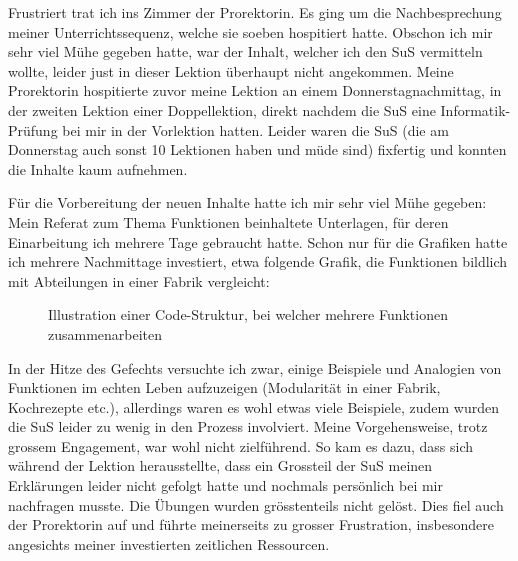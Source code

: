 \begin{myExBox}[title=Beispiel aus der eigenen Unterrichtserfahrung]
Frustriert trat ich ins Zimmer der Prorektorin. Es ging um die Nachbesprechung meiner Unterrichtssequenz, welche sie soeben hospitiert hatte. Obschon ich mir sehr viel Mühe gegeben hatte, war der Inhalt, welcher ich den SuS vermitteln wollte, leider just in dieser Lektion überhaupt nicht angekommen. Meine Prorektorin hospitierte zuvor meine Lektion an einem Donnerstagnachmittag, in der zweiten Lektion einer Doppellektion, direkt nachdem die SuS eine Informatik-Prüfung bei mir in der Vorlektion hatten. Leider waren die SuS (die am Donnerstag auch sonst 10 Lektionen haben und müde sind) fixfertig und konnten die Inhalte kaum aufnehmen.


Für die Vorbereitung der neuen Inhalte hatte ich mir sehr viel Mühe gegeben: Mein Referat zum Thema Funktionen beinhaltete Unterlagen, für deren Einarbeitung ich mehrere Tage gebraucht hatte. Schon nur für die Grafiken hatte ich mehrere Nachmittage investiert, etwa folgende Grafik, die Funktionen bildlich mit Abteilungen in einer Fabrik vergleicht:

\begin{figure}[H]
	\centering
	\caption{Illustration einer Code-Struktur, bei welcher mehrere Funktionen zusammenarbeiten}
\end{figure}
In der Hitze des Gefechts versuchte ich zwar, einige Beispiele und Analogien von Funktionen im echten Leben aufzuzeigen (Modularität in einer Fabrik, Kochrezepte etc.), allerdings waren es wohl etwas viele Beispiele, zudem wurden die SuS leider zu wenig in den Prozess involviert. Meine Vorgehensweise, trotz grossem Engagement, war wohl nicht zielführend. So kam es dazu, dass sich während der Lektion herausstellte, dass ein Grossteil der SuS meinen Erklärungen leider nicht gefolgt hatte und nochmals persönlich bei mir nachfragen musste. Die Übungen wurden grösstenteils nicht gelöst. Dies fiel auch der Prorektorin auf und führte meinerseits zu grosser Frustration, insbesondere angesichts meiner investierten zeitlichen Ressourcen.


\end{myExBox}

